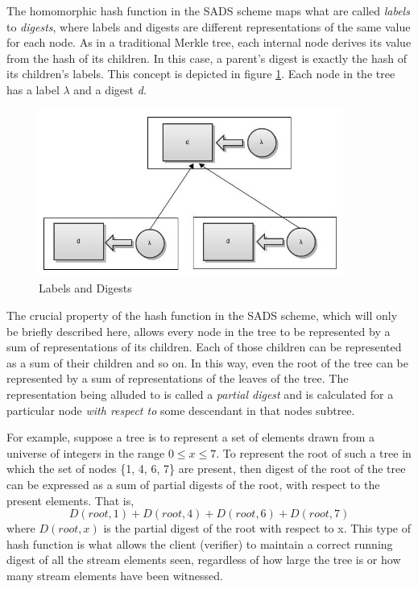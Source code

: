 \documentclass[11pt, letterpaper, oneside]{article}
\begin{document}
	The homomorphic hash function in the SADS scheme maps what are called \textit{labels} to \textit{digests}, where labels and digests are different representations of the same value for each node.
	As in a traditional Merkle tree, each internal node derives its value from the hash of its children.
	In this case, a parent's digest is exactly the hash of its children's labels.
	This concept is depicted in figure \ref{fig:labels-and-digests}.
	Each node in the tree has a label $\lambda$ and a digest \textit{d}.

        \begin{figure}[h]
        \centering
        \includegraphics[width=100mm]{./images/label_digest.jpg}
        \caption[]{Labels and Digests}
        \label{fig:labels-and-digests}
        \end{figure}

	The crucial property of the hash function in the SADS scheme, which will only be briefly described here, allows every node in the tree to be represented by a sum of representations of its children.
	Each of those children can be represented as a sum of their children and so on.
	In this way, even the root of the tree can be represented by a sum of representations of the leaves of the tree.
	The representation being alluded to is called a \textit{partial digest} and is calculated for a particular node \textit{with respect to} some descendant in that nodes subtree.

	For example, suppose a tree is to represent a set of elements drawn from a universe of integers in the range $0 \leq x \leq 7$.
	To represent the root of such a tree in which the set of nodes \{1, 4, 6, 7\} are present, then digest of the root of the tree can be expressed as a sum of partial digests of the root, with respect to the present elements.
	That is,
	\begin{equation}
		\textit{D}(root, 1)+\textit{D}(root, 4)+\textit{D}(root, 6)+\textit{D}(root, 7)
	\end{equation} 
	where $\textit{D}(root, x)$ is the partial digest of the root with respect to x.
	This type of hash function is what allows the client (verifier) to maintain a correct running digest of all the stream elements seen, regardless of how large the tree is or how many stream elements have been witnessed.
\end{document}
